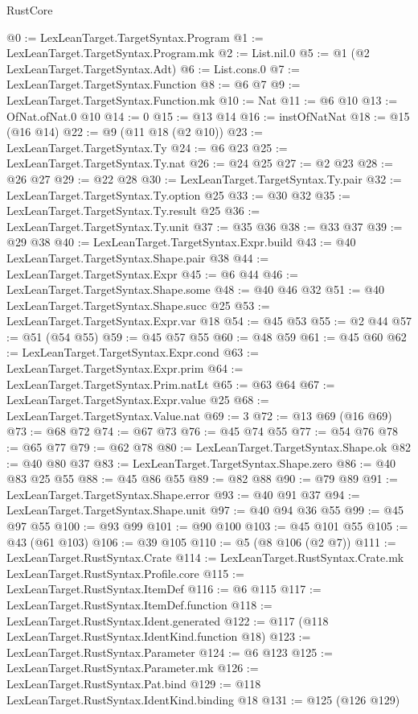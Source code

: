 \begin{lexlean}{RustCore}
\begin{coremodule}
{\begin{coremodule}
{{{{{@0 := LexLeanTarget.TargetSyntax.Program
@1 := LexLeanTarget.TargetSyntax.Program.mk
@2 := List.nil.{0}
@5 := @1 (@2 LexLeanTarget.TargetSyntax.Adt)
@6 := List.cons.{0}
@7 := LexLeanTarget.TargetSyntax.Function
@8 := @6 @7
@9 := LexLeanTarget.TargetSyntax.Function.mk
@10 := Nat
@11 := @6 @10
@13 := OfNat.ofNat.{0} @10
@14 := 0
@15 := @13 @14
@16 := instOfNatNat
@18 := @15 (@16 @14)
@22 := @9 (@11 @18 (@2 @10))
@23 := LexLeanTarget.TargetSyntax.Ty
@24 := @6 @23
@25 := LexLeanTarget.TargetSyntax.Ty.nat
@26 := @24 @25
@27 := @2 @23
@28 := @26 @27
@29 := @22 @28
@30 := LexLeanTarget.TargetSyntax.Ty.pair
@32 := LexLeanTarget.TargetSyntax.Ty.option @25
@33 := @30 @32
@35 := LexLeanTarget.TargetSyntax.Ty.result @25
@36 := LexLeanTarget.TargetSyntax.Ty.unit
@37 := @35 @36
@38 := @33 @37
@39 := @29 @38
@40 := LexLeanTarget.TargetSyntax.Expr.build
@43 := @40 LexLeanTarget.TargetSyntax.Shape.pair @38
@44 := LexLeanTarget.TargetSyntax.Expr
@45 := @6 @44
@46 := LexLeanTarget.TargetSyntax.Shape.some
@48 := @40 @46 @32
@51 := @40 LexLeanTarget.TargetSyntax.Shape.succ @25
@53 := LexLeanTarget.TargetSyntax.Expr.var @18
@54 := @45 @53
@55 := @2 @44
@57 := @51 (@54 @55)
@59 := @45 @57 @55
@60 := @48 @59
@61 := @45 @60
@62 := LexLeanTarget.TargetSyntax.Expr.cond
@63 := LexLeanTarget.TargetSyntax.Expr.prim
@64 := LexLeanTarget.TargetSyntax.Prim.natLt
@65 := @63 @64
@67 := LexLeanTarget.TargetSyntax.Expr.value @25
@68 := LexLeanTarget.TargetSyntax.Value.nat
@69 := 3
@72 := @13 @69 (@16 @69)
@73 := @68 @72
@74 := @67 @73
@76 := @45 @74 @55
@77 := @54 @76
@78 := @65 @77
@79 := @62 @78
@80 := LexLeanTarget.TargetSyntax.Shape.ok
@82 := @40 @80 @37
@83 := LexLeanTarget.TargetSyntax.Shape.zero
@86 := @40 @83 @25 @55
@88 := @45 @86 @55
@89 := @82 @88
@90 := @79 @89
@91 := LexLeanTarget.TargetSyntax.Shape.error
@93 := @40 @91 @37
@94 := LexLeanTarget.TargetSyntax.Shape.unit
@97 := @40 @94 @36 @55
@99 := @45 @97 @55
@100 := @93 @99
@101 := @90 @100
@103 := @45 @101 @55
@105 := @43 (@61 @103)
@106 := @39 @105
@110 := @5 (@8 @106 (@2 @7))
@111 := LexLeanTarget.RustSyntax.Crate
@114 := LexLeanTarget.RustSyntax.Crate.mk LexLeanTarget.RustSyntax.Profile.core
@115 := LexLeanTarget.RustSyntax.ItemDef
@116 := @6 @115
@117 := LexLeanTarget.RustSyntax.ItemDef.function
@118 := LexLeanTarget.RustSyntax.Ident.generated
@122 := @117 (@118 LexLeanTarget.RustSyntax.IdentKind.function @18)
@123 := LexLeanTarget.RustSyntax.Parameter
@124 := @6 @123
@125 := LexLeanTarget.RustSyntax.Parameter.mk
@126 := LexLeanTarget.RustSyntax.Pat.bind
@129 := @118 LexLeanTarget.RustSyntax.IdentKind.binding @18
@131 := @125 (@126 @129)
}}}}}
\end{coremodule}}
\end{coremodule}
\end{lexlean}
